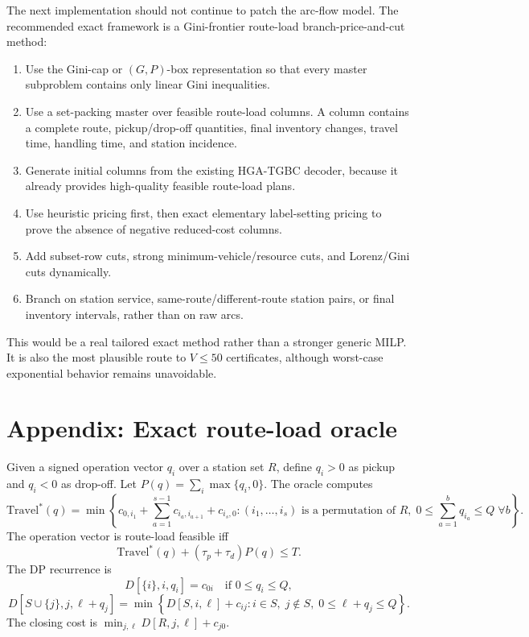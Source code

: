 \documentclass[11pt]{article}
\begin{document}
The next implementation should not continue to patch the arc-flow model.  The recommended exact framework is a Gini-frontier route-load branch-price-and-cut method:
\begin{enumerate}[leftmargin=*]
    \item Use the Gini-cap or $(G,P)$-box representation so that every master subproblem contains only linear Gini inequalities.
    \item Use a set-packing master over feasible route-load columns.  A column contains a complete route, pickup/drop-off quantities, final inventory changes, travel time, handling time, and station incidence.
    \item Generate initial columns from the existing HGA-TGBC decoder, because it already provides high-quality feasible route-load plans.
    \item Use heuristic pricing first, then exact elementary label-setting pricing to prove the absence of negative reduced-cost columns.
    \item Add subset-row cuts, strong minimum-vehicle/resource cuts, and Lorenz/Gini cuts dynamically.
    \item Branch on station service, same-route/different-route station pairs, or final inventory intervals, rather than on raw arcs.
\end{enumerate}

This would be a real tailored exact method rather than a stronger generic MILP.  It is also the most plausible route to $V\le50$ certificates, although worst-case exponential behavior remains unavoidable.

\appendix

\section{Appendix: Exact route-load oracle}

Given a signed operation vector $q_i$ over a station set $R$, define $q_i>0$ as pickup and $q_i<0$ as drop-off.  Let $P(q)=\sum_i\max\{q_i,0\}$.  The oracle computes
\begin{equation}
    \mathrm{Travel}^*(q)=\min \left\{c_{0,i_1}+\sum_{a=1}^{s-1}c_{i_a,i_{a+1}}+c_{i_s,0}: (i_1,\ldots,i_s) \text{ is a permutation of } R,\; 0\le\sum_{a=1}^b q_{i_a}\le Q\;\forall b\right\}.
\end{equation}
The operation vector is route-load feasible iff
\begin{equation}
    \mathrm{Travel}^*(q)+(\tau_p+\tau_d)P(q)\le T.
\end{equation}
The DP recurrence is
\begin{equation}
    D[\{i\},i,q_i]=c_{0i}\quad \text{if }0\le q_i\le Q,
\end{equation}
\begin{equation}
    D[S\cup\{j\},j,\ell+q_j]
    =\min\left\{D[S,i,\ell]+c_{ij}: i\in S,\; j\notin S,
    \;0\le \ell+q_j\le Q\right\}.
\end{equation}
The closing cost is $\min_{j,\ell}D[R,j,\ell]+c_{j0}$.
\end{document}
